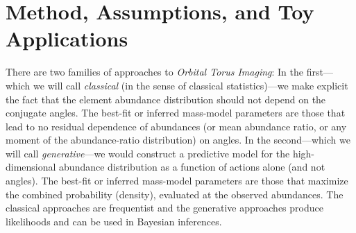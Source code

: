 \documentclass[modern]{aastex63}
\newcommand{\methodname}{\textsl{Orbital Torus Imaging}}
\begin{document}
\section{Method, Assumptions, and Toy Applications}
\label{sec:inferences}

There are two families of approaches to \methodname:
In the first---which we will call \emph{classical} (in the sense of classical
statistics)---we make explicit the fact that the element abundance distribution
should not depend on the conjugate angles.
The best-fit or inferred mass-model parameters are those that lead to no
residual dependence of abundances (or mean abundance ratio, or any moment of the
abundance-ratio distribution) on angles.
In the second---which we will call \emph{generative}---we would construct a
predictive model for the high-dimensional abundance distribution as a function
of actions alone (and not angles).
The best-fit or inferred mass-model parameters are those that maximize the
combined probability (density), evaluated at the observed abundances.
The classical approaches are frequentist and the generative approaches produce
likelihoods and can be used in Bayesian inferences.
\end{document}
